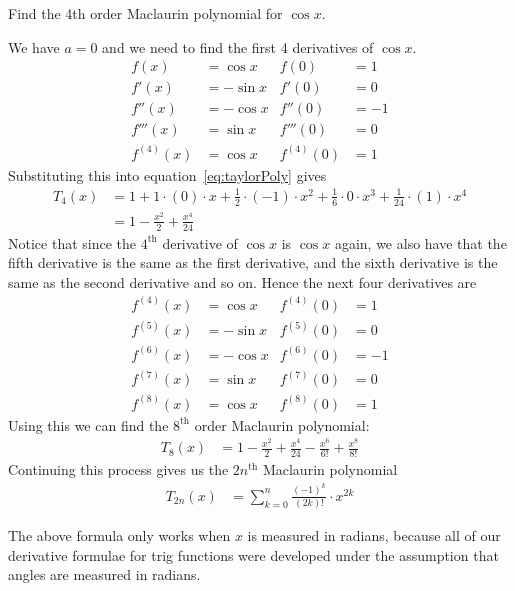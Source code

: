 \begin{eg}\label{eg expand cosx}
 Find the 4th order Maclaurin polynomial for $\cos x$.

\soln We have $a=0$ and we need to find the first 4 derivatives of $\cos x$.
\begin{align*}
 f(x) &= \cos x & f(0) &= 1 \\
 f'(x) &= -\sin x & f'(0) &= 0 \\
 f''(x) &= -\cos x & f''(0) &= -1 \\
 f'''(x) &= \sin x & f'''(0) &= 0 \\
 f^{(4)}(x) &= \cos x & f^{(4)}(0) &= 1
\end{align*}
Substituting this into equation~\eqref{eq:taylorPoly} gives
\begin{align*}
  T_4(x)&= 1 + 1\cdot (0) \cdot x
  + \frac{1}{2} \cdot (-1) \cdot x^2
  + \frac{1}{6} \cdot 0 \cdot x^3
  + \frac{1}{24} \cdot (1) \cdot x^4 \\
  &= 1 - \frac{x^2}{2} + \frac{x^4}{24}
\end{align*}
Notice that since the $4^\mathrm{th}$ derivative of $\cos x$ is $\cos x$ again, we also
have that the fifth derivative is the same as the first derivative, and the sixth
derivative is the same as the second derivative and so on. Hence the next four
derivatives are
\begin{align*}
 f^{(4)}(x) &= \cos x & f^{(4)}(0) &= 1 \\
 f^{(5)}(x) &= -\sin x & f^{(5)}(0) &= 0 \\
 f^{(6)}(x) &= -\cos x & f^{(6)}(0) &= -1 \\
 f^{(7)}(x) &= \sin x & f^{(7)}(0) &= 0 \\
 f^{(8)}(x) &= \cos x & f^{(8)}(0) &= 1
\end{align*}
Using this we can find the $8^\mathrm{th}$ order Maclaurin polynomial:
\begin{align*}
  T_8(x) &=
  1 - \frac{x^2}{2} + \frac{x^4}{24} -\frac{x^6}{6!} + \frac{x^8}{8!}
\end{align*}
Continuing this process gives us the $2n^\mathrm{th}$ Maclaurin polynomial
\begin{align*}
  T_{2n}(x) &= \sum_{k=0}^n \frac{(-1)^k}{(2k)!} \cdot x^{2k}
\end{align*}
\begin{warning}
The above formula only works when $x$ is measured in radians, because all of our
derivative formulae for trig functions were developed under the assumption that
angles are measured in radians.
\end{warning}


\end{eg}
